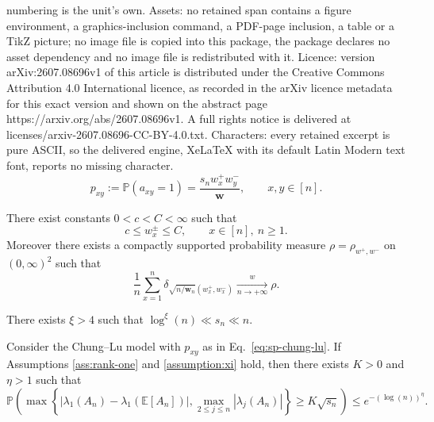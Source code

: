 \documentclass[10pt,a4paper]{amsart}
\newcommand{\E}{\mathbb{E}}
\newcommand{\p}{\mathbb{P}}
\newcommand{\scaling}{s_n}
\newcommand{\wconv}{\xrightarrow[\textit{n} \to +\infty]{\quad {w} \quad}}
\newcommand{\w}{\boldsymbol{w}}
\begin{document}
numbering is the unit's own. Assets: no retained span contains a figure environment, a graphics-inclusion command, a PDF-page inclusion, a table or a TikZ picture; no image file is copied into this package, the package declares no asset dependency and no image file is redistributed with it. Licence: version arXiv:2607.08696v1 of this article is distributed under the Creative Commons Attribution 4.0 International licence, as recorded in the arXiv licence metadata for this exact version and shown on the abstract page https://arxiv.org/abs/2607.08696v1. A full rights notice is delivered at licenses/arxiv-2607.08696-CC-BY-4.0.txt. Characters: every retained excerpt is pure ASCII, so the delivered engine, XeLaTeX with its default Latin Modern text font, reports no missing character.
\begin{equation}
\label{eq:sp-chung-lu}
        p_{xy}:=\mathbb P(a_{xy}=1)=\frac{s_n w_x^+w_y^-}{\w},
        \qquad x,y\in[n].
\end{equation} 

\begin{assumption}
\label{ass:rank-one}
There exist constants $0<c<C<\infty$ such that
\begin{equation}
\label{eq:weight-bounds}
        c\le w_x^\pm\le C,\qquad x\in[n],\ n\ge1.
\end{equation}
Moreover there exists a compactly supported probability measure
$\rho=\rho_{w^+,w^-}$ on $(0,\infty)^2$ such that
\begin{equation}
\label{eq:rho-one}
        \frac1n\sum_{x=1}^n
        \delta_{\sqrt{n/\w_n}(w_x^+,w_x^-)}
        \wconv \rho .
\end{equation}
\end{assumption}

\begin{assumption}\label{assumption:xi} 
There exists $\xi>4$ such that $ \log^\xi(n)\ll \scaling \ll n$.
\end{assumption}

\begin{theorem} \label{thm:LLN-A}
Consider the Chung--Lu model with $p_{xy}$ as in Eq.\ \eqref{eq:sp-chung-lu}.
If Assumptions \ref{ass:rank-one} and \ref{assumption:xi} hold, then there exists $K>0$ and $\eta>1$ such that
\begin{equation}
    \p\left(\max\left\{\left|\lambda_1(A_n)- \lambda_1(\E[A_n]) \right|,\max_{ 2 \le j\le n}|\lambda_j(A_n)|\right\}\ge K\sqrt{\scaling} \right)\le e^{-(\log(n))^{\eta}}.
\end{equation}
\end{theorem}
\end{document}
